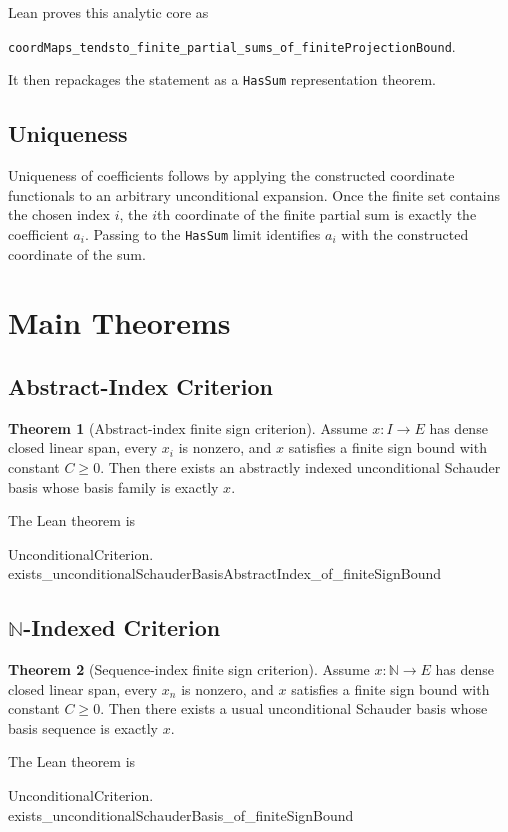 \documentclass[12pt,a4paper]{article}
\theoremstyle{definition}
\newtheorem{theorem}{Theorem}[section]
\newcommand{\Nat}{\mathbb{N}}
\begin{document}
Lean proves this analytic core as
\begin{center}
\verb|coordMaps_tendsto_finite_partial_sums_of_finiteProjectionBound|.
\end{center}
It then repackages the statement as a \verb|HasSum| representation theorem.

\subsection{Uniqueness}

Uniqueness of coefficients follows by applying the constructed coordinate
functionals to an arbitrary unconditional expansion.  Once the finite set
contains the chosen index $i$, the $i$th coordinate of the finite partial sum
is exactly the coefficient $a_i$.  Passing to the \verb|HasSum| limit identifies
$a_i$ with the constructed coordinate of the sum.

\newpage

\section{Main Theorems}
\label{sec:main-theorems}

\subsection{Abstract-Index Criterion}

\begin{theorem}[Abstract-index finite sign criterion]
Assume $x : I\to E$ has dense closed linear span, every $x_i$ is nonzero, and
$x$ satisfies a finite sign bound with constant $C\ge 0$.  Then there exists an
abstractly indexed unconditional Schauder basis whose basis family is exactly
$x$.

The Lean theorem is
\begin{center}
{\scriptsize\ttfamily
UnconditionalCriterion.\\
exists\_unconditionalSchauderBasisAbstractIndex\_of\_finiteSignBound}
\end{center}
\end{theorem}

\subsection{\texorpdfstring{$\Nat$}{Nat}-Indexed Criterion}

\begin{theorem}[Sequence-index finite sign criterion]
Assume $x : \Nat\to E$ has dense closed linear span, every $x_n$ is nonzero,
and $x$ satisfies a finite sign bound with constant $C\ge 0$.  Then there
exists a usual unconditional Schauder basis whose basis sequence is exactly
$x$.

The Lean theorem is
\begin{center}
{\scriptsize\ttfamily
UnconditionalCriterion.\\
exists\_unconditionalSchauderBasis\_of\_finiteSignBound}
\end{center}
\end{theorem}
\end{document}
